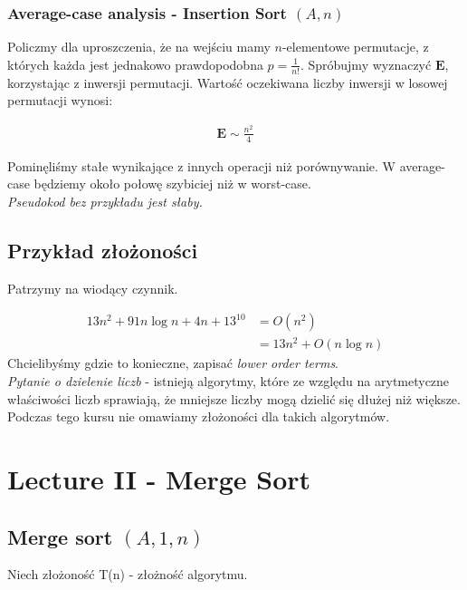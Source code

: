 \documentclass{article}
\begin{document}
\subsubsection{Average-case analysis - Insertion Sort $(A,n)$}

Policzmy dla uproszczenia, że na wejściu mamy $n$-elementowe permutacje, z których każda jest jednakowo prawdopodobna $p=\frac{1}{n!}$. Spróbujmy wyznaczyć $\mathbf{E}$, korzystając z inwersji permutacji. Wartość oczekiwana liczby inwersji w losowej permutacji wynosi:

\begin{align}
    \mathbf{E} \sim \frac{n^2}{4}
\end{align}

\noindent
Pominęliśmy stałe wynikające z innych operacji niż porównywanie. W average-case będziemy około połowę szybiciej niż w worst-case.\\

\noindent
\textit{Pseudokod bez przykładu jest słaby.}

\subsection{Przykład złożoności}

Patrzymy na wiodący czynnik.

\begin{align}
    13n^2 + 91n\log n + 4n + 13^{10} &= O(n^2)\\
    &= 13n^2 + O(n\log n)
\end{align}
\noindent
Chcielibyśmy gdzie to konieczne, zapisać \textit{lower order terms}.\\

\noindent
\textit{Pytanie o dzielenie liczb} - istnieją algorytmy, które ze względu na arytmetyczne właściwości liczb sprawiają, że mniejsze liczby mogą dzielić się dłużej niż większe. Podczas tego kursu nie omawiamy złożoności dla takich algorytmów.  

\section{Lecture II - Merge Sort}

\subsection{Merge sort $(A,1,n)$}

Niech złożoność T(n) - złożność algorytmu.
\end{document}
